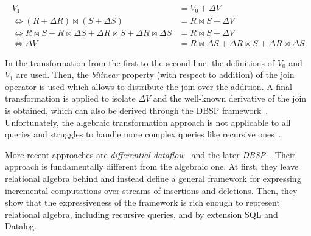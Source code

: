 \begin{equation}
	\begin{aligned}
		V_1                                                                                               & = V_0 + \Delta V                                                      \\
		\Leftrightarrow (R + \Delta R) \bowtie (S + \Delta S)                                             & = R \bowtie S + \Delta V                                              \\
		\Leftrightarrow R \bowtie S + R \bowtie \Delta S + \Delta R \bowtie S + \Delta R \bowtie \Delta S & = R \bowtie S + \Delta V                                              \\
		\Leftrightarrow \Delta V                                                                          & = R \bowtie \Delta S + \Delta R \bowtie S + \Delta R \bowtie \Delta S
	\end{aligned}
\end{equation}

In the transformation from the first to the second line, the definitions
of \(V_0\) and \(V_1\) are used.
Then, the \emph{bilinear} property (with respect to addition) of the join
operator is used which allows to distribute the join over the addition.
A final transformation is applied to isolate \(\Delta V\) and the well-known
derivative of the join~\cite{idris2017dynamic} is obtained, which can also be
derived through the DBSP framework~\cite{budiu2025dbsp}.
Unfortunately, the algebraic transformation approach is not applicable
to all queries and struggles to handle more complex queries like
recursive ones~\cite{budiu2025dbsp}.

More recent approaches are \emph{differential dataflow}~\cite{mcsherry2013differential}
and the later \emph{DBSP}~\cite{budiu2022dbsp, budiu2024dbsp, budiu2025dbsp}.
Their approach is fundamentally different from the algebraic one.
At first, they leave relational algebra behind and instead define a general
framework for expressing incremental computations over streams of insertions
and deletions.
Then, they show that the expressiveness of the framework is rich enough to
represent relational algebra, including recursive queries, and by extension
SQL and Datalog.

